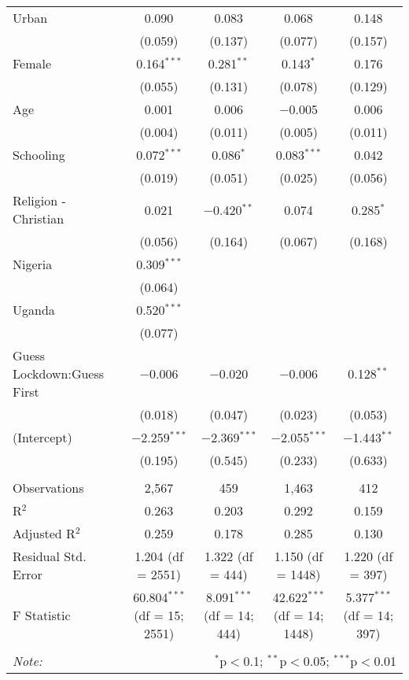 \begin{table}[!htbp]
\begin{tabular}{@{\extracolsep{5pt}}lcccc}
  Urban & 0.090 & 0.083 & 0.068 & 0.148 \\ 
  & (0.059) & (0.137) & (0.077) & (0.157) \\ 
  Female & 0.164$^{***}$ & 0.281$^{**}$ & 0.143$^{*}$ & 0.176 \\ 
  & (0.055) & (0.131) & (0.078) & (0.129) \\ 
  Age & 0.001 & 0.006 & $-$0.005 & 0.006 \\ 
  & (0.004) & (0.011) & (0.005) & (0.011) \\ 
  Schooling & 0.072$^{***}$ & 0.086$^{*}$ & 0.083$^{***}$ & 0.042 \\ 
  & (0.019) & (0.051) & (0.025) & (0.056) \\ 
  Religion - Christian & 0.021 & $-$0.420$^{**}$ & 0.074 & 0.285$^{*}$ \\ 
  & (0.056) & (0.164) & (0.067) & (0.168) \\ 
  Nigeria & 0.309$^{***}$ &  &  &  \\ 
  & (0.064) &  &  &  \\ 
  Uganda & 0.520$^{***}$ &  &  &  \\ 
  & (0.077) &  &  &  \\ 
  Guess Lockdown:Guess First & $-$0.006 & $-$0.020 & $-$0.006 & 0.128$^{**}$ \\ 
  & (0.018) & (0.047) & (0.023) & (0.053) \\ 
  (Intercept) & $-$2.259$^{***}$ & $-$2.369$^{***}$ & $-$2.055$^{***}$ & $-$1.443$^{**}$ \\ 
  & (0.195) & (0.545) & (0.233) & (0.633) \\ 
 \hline \\[-1.8ex] 
Observations & 2,567 & 459 & 1,463 & 412 \\ 
R$^{2}$ & 0.263 & 0.203 & 0.292 & 0.159 \\ 
Adjusted R$^{2}$ & 0.259 & 0.178 & 0.285 & 0.130 \\ 
Residual Std. Error & 1.204 (df = 2551) & 1.322 (df = 444) & 1.150 (df = 1448) & 1.220 (df = 397) \\ 
F Statistic & 60.804$^{***}$ (df = 15; 2551) & 8.091$^{***}$ (df = 14; 444) & 42.622$^{***}$ (df = 14; 1448) & 5.377$^{***}$ (df = 14; 397) \\ 
\hline 
\hline \\[-1.8ex] 
\textit{Note:}  & \multicolumn{4}{r}{$^{*}$p$<$0.1; $^{**}$p$<$0.05; $^{***}$p$<$0.01} \\ 
\end{tabular} 
\end{table} 
